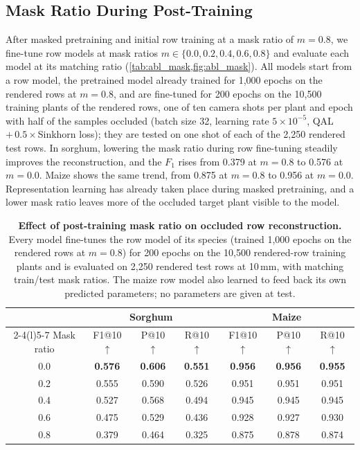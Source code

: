\documentclass[10pt,twocolumn,letterpaper]{article}
\begin{document}
\subsection{Mask Ratio During Post-Training}
\label{sec:abl_mask}

After masked pretraining and initial row training at a mask ratio of $m = 0.8$, we fine-tune row models at mask ratios
$m \in \{0.0, 0.2, 0.4, 0.6, 0.8\}$ and evaluate each model at its matching ratio (\cref{tab:abl_mask,fig:abl_mask}). All
models start from a row model, \ie the pretrained model already trained for 1{,}000 epochs on the rendered rows at
$m = 0.8$, and are fine-tuned for 200 epochs on the 10{,}500 training plants of the rendered rows, one of ten camera shots
per plant and epoch with half of the samples occluded (batch size 32, learning rate $5\times10^{-5}$, QAL
$+\,0.5\times$Sinkhorn loss); they are tested on one shot of each of the 2{,}250 rendered test rows. In sorghum, lowering the mask ratio
during row fine-tuning steadily improves the reconstruction, and the $F_1$ rises from 0.379 at $m = 0.8$ to
0.576 at $m = 0.0$. Maize shows the same trend, from 0.875 at $m = 0.8$ to 0.956 at $m = 0.0$. Representation learning has already taken place during masked pretraining, and a
lower mask ratio leaves more of the occluded target plant visible to the model.

\begin{table}[t]
  \caption{\textbf{Effect of post-training mask ratio on occluded row reconstruction.} Every model fine-tunes the row
  model of its species (trained 1{,}000 epochs on the rendered rows at $m=0.8$) for 200 epochs on the 10{,}500
  rendered-row training plants and is evaluated on 2{,}250 rendered test rows at 10\,mm, with matching train/test mask
  ratios. The maize row model also learned to feed back its own predicted parameters; no parameters are given at test.}
  \label{tab:abl_mask}
  \centering\footnotesize
  \setlength{\tabcolsep}{2.5pt}
  \begin{tabular}{@{}ccccccc@{}}
    \toprule
    & \multicolumn{3}{c}{Sorghum} & \multicolumn{3}{c}{Maize} \\
    \cmidrule(lr){2-4}\cmidrule(l){5-7}
    Mask ratio & F1@10 $\uparrow$ & P@10 $\uparrow$ & R@10 $\uparrow$ & F1@10 $\uparrow$ & P@10 $\uparrow$ & R@10 $\uparrow$ \\
    \midrule
    0.0 & \textbf{0.576} & \textbf{0.606} & \textbf{0.551} & \textbf{0.956} & \textbf{0.956} & \textbf{0.955} \\
    0.2 & 0.555 & 0.590 & 0.526 & 0.951 & 0.951 & 0.951 \\
    0.4 & 0.527 & 0.568 & 0.494 & 0.945 & 0.945 & 0.945 \\
    0.6 & 0.475 & 0.529 & 0.436 & 0.928 & 0.927 & 0.930 \\
    0.8 & 0.379 & 0.464 & 0.325 & 0.875 & 0.878 & 0.874 \\
    \bottomrule
  \end{tabular}
\end{table}
\end{document}
